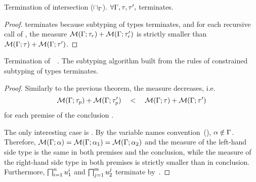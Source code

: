 
\begin{lemma}{Termination of intersection ($\sqcap_{\Gamma}$).}%
\label{lem:meet-terminates}
    $\forall \Gamma, \tau, \tau',$
     terminates.
\end{lemma}
\begin{proof}
     terminates because subtyping of types terminates,
    and for each recursive call  of 
    , the measure $\operatorname{\mathcal{M}}(\Gamma;\tau_r) + \operatorname{\mathcal{M}}(\Gamma;\tau'_r)$ 
    is strictly smaller than $\operatorname{\mathcal{M}}(\Gamma;\tau) + \operatorname{\mathcal{M}}(\Gamma;\tau')$.
\end{proof}

\begin{theorem}{Termination of\ \ .}%
\label{thm:subtyctr-terminates}
    The subtyping algorithm built from the rules of
    constrained subtyping of types
     terminates.
\end{theorem}
\begin{proof}
    Similarly to the previous theorem, the measure decreases, i.e.
    \[\operatorname{\mathcal{M}}(\Gamma;\tau_p) + \operatorname{\mathcal{M}}(\Gamma;\tau'_p) \quad<\quad 
    \operatorname{\mathcal{M}}(\Gamma;\tau) + \operatorname{\mathcal{M}}(\Gamma;\tau')\]
    for each premise 
    of the conclusion .
    
    The only interesting case is .
    By the variable names convention~(), $\alpha \notin \Gamma$.
    Therefore, $\operatorname{\mathcal{M}}(\Gamma;\alpha) = \operatorname{\mathcal{M}}(\Gamma;\alpha_1) = \operatorname{\mathcal{M}}(\Gamma;\alpha_2)$
    and the measure of the left-hand side type is the same in both premises
    and the conclusion,
    while the measure of the right-hand side type in both premises 
    is strictly smaller than in conclusion.
    Furthermore, $\textstyle\bigsqcap_{i=1}^n u_1^i$ and $\textstyle\bigsqcap_{j=1}^m u_2^j$
    terminate by~.
\end{proof}

